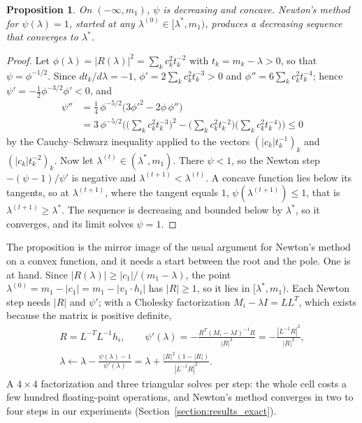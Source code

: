 \documentclass{birkjour}
\newtheorem{prop}[thm]{Proposition}
\theoremstyle{remark}
\numberwithin{equation}{section}
\begin{document}
\begin{prop}
\label{prop:secular_newton}
On $(-\infty, m_1)$, $\psi$ is decreasing and concave. Newton's method for $\psi(\lambda) = 1$, started at any $\lambda^{(0)} \in [\lambda^*, m_1)$, produces a decreasing sequence that converges to $\lambda^*$.
\end{prop}
\begin{proof}
Let $\phi(\lambda) = |R(\lambda)|^2 = \sum_k c_k^2 t_k^{-2}$ with $t_k = m_k - \lambda > 0$, so that $\psi = \phi^{-1/2}$. Since $dt_k/d\lambda = -1$, $\phi' = 2 \sum_k c_k^2 t_k^{-3} > 0$ and $\phi'' = 6 \sum_k c_k^2 t_k^{-4}$; hence $\psi' = -\frac12 \phi^{-3/2} \phi' < 0$, and
\begin{equation*}
\begin{aligned}
\psi'' &= \tfrac14 \, \phi^{-5/2} \big( 3 \phi'^2 - 2 \phi \, \phi'' \big) \\
&= 3 \, \phi^{-5/2} \Big( \big( \textstyle\sum_k c_k^2 t_k^{-3} \big)^2 - \big( \sum_k c_k^2 t_k^{-2} \big) \big( \sum_k c_k^2 t_k^{-4} \big) \Big) \leq 0
\end{aligned}
\end{equation*}
by the Cauchy--Schwarz inequality applied to the vectors $(|c_k| t_k^{-1})_k$ and $(|c_k| t_k^{-2})_k$. Now let $\lambda^{(t)} \in (\lambda^*, m_1)$. There $\psi < 1$, so the Newton step $-(\psi - 1)/\psi'$ is negative and $\lambda^{(t+1)} < \lambda^{(t)}$. A concave function lies below its tangents, so at $\lambda^{(t+1)}$, where the tangent equals $1$, $\psi(\lambda^{(t+1)}) \leq 1$, that is $\lambda^{(t+1)} \geq \lambda^*$. The sequence is decreasing and bounded below by $\lambda^*$, so it converges, and its limit solves $\psi = 1$.
\end{proof}

The proposition is the mirror image of the usual argument for Newton's method on a convex function, and it needs a start between the root and the pole. One is at hand. Since $|R(\lambda)| \geq |c_1| / (m_1 - \lambda)$, the point $\lambda^{(0)} = m_1 - |c_1| = m_1 - |v_1 \cdot h_i|$ has $|R| \geq 1$, so it lies in $[\lambda^*, m_1)$. Each Newton step needs $|R|$ and $\psi'$; with a Cholesky factorization $M_i - \lambda I = L L^T$, which exists because the matrix is positive definite,
\begin{gather*}
R = L^{-T} L^{-1} h_i, \qquad \psi'(\lambda) = -\frac{R^T (M_i - \lambda I)^{-1} R}{|R|^3} = -\frac{|L^{-1} R|^2}{|R|^3},
\\
\lambda \leftarrow \lambda - \frac{\psi(\lambda) - 1}{\psi'(\lambda)} = \lambda + \frac{|R|^2 \, (1 - |R|)}{|L^{-1} R|^2} .
\end{gather*}
A $4 \times 4$ factorization and three triangular solves per step: the whole cell costs a few hundred floating-point operations, and Newton's method converges in two to four steps in our experiments (Section~\ref{section:results_exact}).
\end{document}
